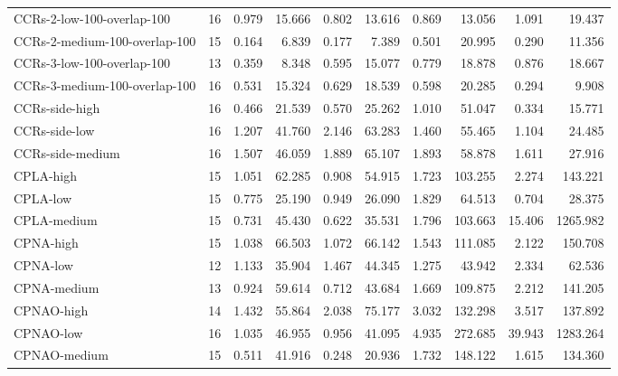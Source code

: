 \begin{longtable}{lrrrrrrrrr}
CCRs-2-low-100-overlap-100 & 16 & 0.979 & 15.666 & 0.802 & 13.616 & 0.869 & 13.056 & 1.091 & 19.437 \\
CCRs-2-medium-100-overlap-100 & 15 & 0.164 & 6.839 & 0.177 & 7.389 & 0.501 & 20.995 & 0.290 & 11.356 \\
CCRs-3-low-100-overlap-100 & 13 & 0.359 & 8.348 & 0.595 & 15.077 & 0.779 & 18.878 & 0.876 & 18.667 \\
CCRs-3-medium-100-overlap-100 & 16 & 0.531 & 15.324 & 0.629 & 18.539 & 0.598 & 20.285 & 0.294 & 9.908 \\
CCRs-side-high & 16 & 0.466 & 21.539 & 0.570 & 25.262 & 1.010 & 51.047 & 0.334 & 15.771 \\
CCRs-side-low & 16 & 1.207 & 41.760 & 2.146 & 63.283 & 1.460 & 55.465 & 1.104 & 24.485 \\
CCRs-side-medium & 16 & 1.507 & 46.059 & 1.889 & 65.107 & 1.893 & 58.878 & 1.611 & 27.916 \\
CPLA-high & 15 & 1.051 & 62.285 & 0.908 & 54.915 & 1.723 & 103.255 & 2.274 & 143.221 \\
CPLA-low & 15 & 0.775 & 25.190 & 0.949 & 26.090 & 1.829 & 64.513 & 0.704 & 28.375 \\
CPLA-medium & 15 & 0.731 & 45.430 & 0.622 & 35.531 & 1.796 & 103.663 & 15.406 & 1265.982 \\
CPNA-high & 15 & 1.038 & 66.503 & 1.072 & 66.142 & 1.543 & 111.085 & 2.122 & 150.708 \\
CPNA-low & 12 & 1.133 & 35.904 & 1.467 & 44.345 & 1.275 & 43.942 & 2.334 & 62.536 \\
CPNA-medium & 13 & 0.924 & 59.614 & 0.712 & 43.684 & 1.669 & 109.875 & 2.212 & 141.205 \\
CPNAO-high & 14 & 1.432 & 55.864 & 2.038 & 75.177 & 3.032 & 132.298 & 3.517 & 137.892 \\
CPNAO-low & 16 & 1.035 & 46.955 & 0.956 & 41.095 & 4.935 & 272.685 & 39.943 & 1283.264 \\
CPNAO-medium & 15 & 0.511 & 41.916 & 0.248 & 20.936 & 1.732 & 148.122 & 1.615 & 134.360 \\
\bottomrule
\end{longtable}
\endgroup
